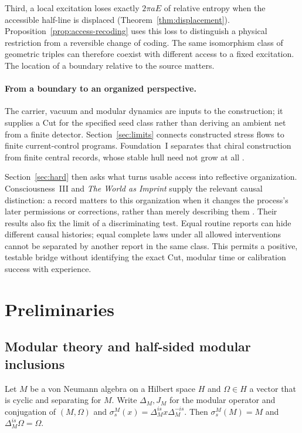 \documentclass[12pt]{article}
\theoremstyle{definition}
\theoremstyle{remark}
\begin{document}
Third, a local excitation loses exactly \(2\pi aE\) of relative entropy
when the accessible half-line is displaced
(Theorem~\ref{thm:displacement}). Proposition~\ref{prop:access-recoding}
uses this loss to distinguish a physical restriction from a reversible
change of coding. The same isomorphism class of geometric triples can
therefore coexist with different access to a fixed excitation.
The location of a boundary relative to the source matters.

\paragraph{From a boundary to an organized perspective.}
The carrier, vacuum and modular dynamics are inputs to the construction;
it supplies a Cut for the specified seed class rather than deriving an
ambient net from a finite detector. Section~\ref{sec:limits} connects
constructed stress flows to finite current-control programs. Foundation~I
separates that chiral construction from finite central records, whose
stable hull need not grow at all \cite{FoundationI}.

Section~\ref{sec:hard} then asks what turns usable access into reflective
organization. Consciousness~III and \emph{The World as Imprint} supply
the relevant causal distinction: a record matters to this organization
when it changes the process's later permissions or corrections, rather
than merely describing them \cite{PaperCIII,WorldImprint}. Their results
also fix the limit of a discriminating test. Equal routine reports can
hide different causal histories; equal complete laws under all allowed
interventions cannot be separated by another report in the same class.
This permits a positive, testable bridge without identifying the exact
Cut, modular time or calibration success with experience.

\section{Preliminaries}\label{sec:prelim}

\subsection{Modular theory and half-sided modular inclusions}

Let \(M\) be a von Neumann algebra on a Hilbert space \(H\) and \(\Omega\in H\)
a vector that is cyclic and separating for \(M\). Write \(\Delta_M,J_M\) for the
modular operator and conjugation of \((M,\Omega)\) and
\(\sigma^M_s(x)=\Delta_M^{is}x\Delta_M^{-is}\). Then \(\sigma^M_s(M)=M\) and
\(\Delta_M^{is}\Omega=\Omega\).
\end{document}
